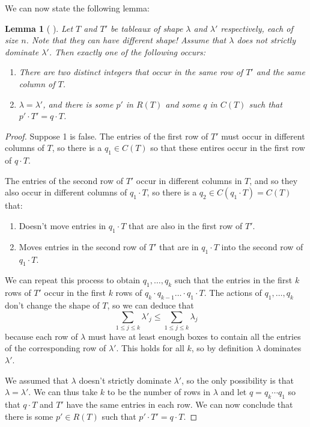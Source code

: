 \documentclass[12pt,twoside]{reedthesis}
\theoremstyle{plain}   %
\newtheorem{lemma}{Lemma}[section]
\theoremstyle{definition}
\theoremstyle{remark}
\numberwithin{equation}{section}
\begin{document}
  We can now state the following lemma:
  \begin{lemma}[ {\cite[Lemma 7.1]{fulton}} ] \label{lem1}
    Let $T$ and $T'$ be tableaux of shape $\lambda$ and $\lambda'$ respectively, each of size $n$. Note that they can have different shape!
    Assume that $\lambda$ does not strictly dominate $\lambda'$.
    Then exactly one of the following occurs:
    \begin{enumerate}
    \item There are two distinct integers that occur in the same row of $T'$ and the same column of $T$.
    \item $\lambda = \lambda'$, and there is some $p'$ in $R(T)$ and some $q$ in $C(T)$ such that $p' \cdot T' = q \cdot T$.
    \end{enumerate}
  \end{lemma}
  \begin{proof}
    Suppose 1 is false. The entries of the first row of $T'$ must occur in different columns of $T$,
    so there is a $q_1 \in C(T)$ so that these entires occur in the first row of $q \cdot T$.\par
    The entries of the second row of $T'$ occur in different columns in $T$, and so they also occur in different columns of $q_1 \cdot T$,
    so there is a $q_2 \in C(q_1 \cdot T) = C(T)$ that:
    \begin{enumerate}
    \item Doesn't move entries in $q_1 \cdot T$ that are also in the first row of $T'$.
    \item Moves entries in the second row of $T'$ that are in $q_1 \cdot T$
      into the second row of $q_1 \cdot T$.
    \end{enumerate}
    We can repeat this process to obtain $q_1, \dots, q_k$ such that the entries in the first $k$ rows of $T'$ occur in the first $k$ rows of
    $q_k \cdot q_{k-1} \dots \cdot q_1 \cdot T$. The actions of $q_1, \dots, q_k$ don't change the shape of $T$, so we can deduce that
    \[\sum_{1 \leq j \leq k} \lambda'_j \leq \sum_{1 \leq j \leq k} \lambda_j\]
    because each row of $\lambda$ must have at least enough boxes to contain all the entries of the corresponding row of $\lambda'$.
    This holds for all $k$, so by definition $\lambda$ dominates $\lambda'$. \par
    We assumed that $\lambda$ doesn't strictly dominate $\lambda'$, so the only possibility is that $\lambda = \lambda'$.
    We can thus take $k$ to be the number of rows in $\lambda$ and let $q = q_k \cdots q_1$ so that
    $q \cdot T$ and $T'$ have the same entries in each row.
    We can now conclude that there is some $p' \in R(T)$ such that $p' \cdot T' = q \cdot T$.
  \end{proof}
\end{document}
